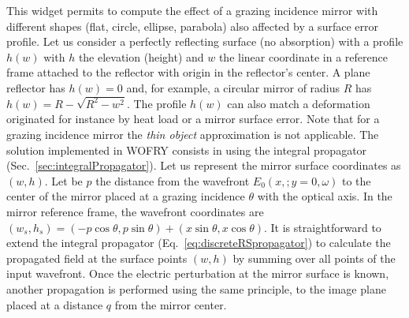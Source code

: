 \documentclass{iopconfser}
\newcommand{\todo}[1]{{\color{red}[TODO: "#1'']}}
\begin{document}
This widget permits to compute the effect of a grazing incidence mirror with different shapes (flat, circle, ellipse, parabola) also affected by a surface error profile.
Let us consider a perfectly reflecting surface (no absorption) with a profile $h(w)$ with $h$ the elevation (height) and $w$ the linear coordinate in a reference frame attached to the reflector with origin in the reflector's center. A plane reflector has $h(w)=0$ and, for example, a circular mirror of radius $R$ has $h(w)=R-\sqrt{R^2 - w^2}$. The profile $h(w)$ can also match a deformation originated for instance by heat load or a mirror surface error.
Note that for a grazing incidence mirror  the  {\it thin object} approximation is not applicable. The solution implemented in WOFRY consists in using the integral propagator (Sec.~\ref{sec:integralPropagator}).
Let us represent the mirror surface coordinates as $(w,h)$. Let be $p$ the distance from the wavefront $E_0(x,;y=0,\omega)$ to the center of the mirror placed at a grazing incidence $\theta$ with the optical axis. In the mirror reference frame, the wavefront coordinates are $(w_s, h_s) =(-p \cos \theta, p \sin \theta) + (x \sin \theta, x \cos \theta)$. It is straightforward to extend the integral propagator (Eq.~\ref{eq:discreteRSpropagator}) to calculate the propagated field at the surface points $(w,h)$ by summing over all points of the input wavefront. Once the electric perturbation at the mirror surface is known, another propagation is performed using the same principle, to the image plane placed at a distance $q$ from the mirror center.


\end{document}
